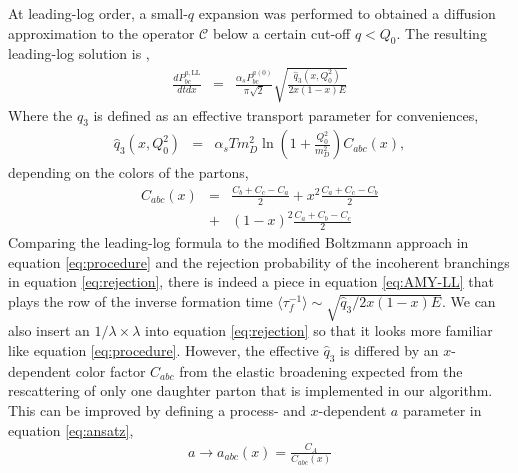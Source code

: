 \documentclass[aps, prc, reprint, amsmath, groupedaddress, nofootinbib]{revtex4-1}
\begin{document}
At leading-log order, a small-$q$ expansion was performed to obtained a diffusion approximation to the operator $\mathcal{C}$ below a certain cut-off $q<Q_0$.
The resulting leading-log solution is \cite{Arnold:2008zu},
\begin{eqnarray}\label{eq:AMY-LL}
\frac{dP_{bc}^{a,\textrm{LL}}}{dt dx} &=& \frac{\alpha_s P_{bc}^{a(0)}}{\pi\sqrt{2}}
\sqrt{\frac{\hat{q}_3(x, Q_0^2)}{2x(1-x)E}}
\end{eqnarray}
Where the $\hat{q}_3$ is defined as an effective transport parameter for conveniences,
\begin{eqnarray}
\hat{q}_3(x, Q_0^2) &=& \alpha_s T m_D^2 \ln\left(1+\frac{Q_0^2}{m_D^2}\right) C_{abc}(x),\label{eq:qhat3}
\end{eqnarray}
depending on the colors of the partons,
\begin{eqnarray}
C_{abc}(x) &=&  \frac{C_b+C_c-C_a}{2} + x^2 \frac{C_a+C_c-C_b}{2} \\\nonumber
&+& (1-x)^2\frac{C_a+C_b-C_c}{2}
\end{eqnarray}
Comparing the leading-log formula to the modified Boltzmann approach in equation \ref{eq:procedure} and the rejection probability of the incoherent branchings in equation \ref{eq:rejection}, there is indeed a piece in equation \ref{eq:AMY-LL} that plays the row of the inverse formation time $\langle\tau_f^{-1}\rangle \sim \sqrt{\hat{q}_3 / 2x(1-x)E}$.
We can also insert an $1/\lambda \times \lambda$ into equation \ref{eq:rejection} so that it looks more familiar like equation \ref{eq:procedure}.
However, the effective $\hat{q}_3$ is differed by an $x$-dependent color factor $C_{abc}$ from the elastic broadening expected from the rescattering of only one daughter parton that is implemented in our algorithm.
This can be improved by defining a process- and $x$-dependent $a$ parameter in equation \ref{eq:ansatz},
\begin{eqnarray}
a \rightarrow a_{abc}(x) = \frac{C_A}{C_{abc}(x)}
\end{eqnarray}
\end{document}
